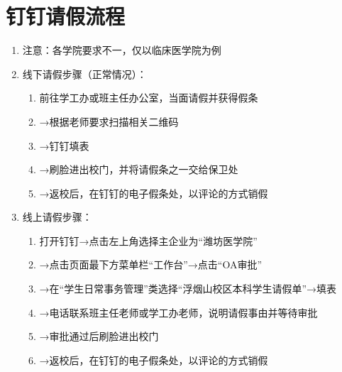 \section[钉钉请假流程]{钉钉请假流程\footnotemark}
\label{leave_dingtalk}
\begin{enumerate}
    \item 注意：各学院要求不一，仅以临床医学院为例
    \item 线下请假步骤（正常情况）：
          \begin{enumerate}[（1）]
              \item 前往学工办或班主任办公室，当面请假并获得假条
              \item →根据老师要求扫描相关二维码
              \item →钉钉填表
              \item →刷脸进出校门，并将请假条之一交给保卫处
              \item →返校后，在钉钉的电子假条处，以评论的方式销假
          \end{enumerate}
    \item 线上请假步骤：
          \begin{enumerate}[（1）]
              \item 打开钉钉→点击左上角选择主企业为“潍坊医学院”
              \item →点击页面最下方菜单栏“工作台”→点击“OA审批”
              \item →在“学生日常事务管理”类选择“浮烟山校区本科学生请假单”→填表
              \item →电话联系班主任老师或学工办老师，说明请假事由并等待审批
              \item →审批通过后刷脸进出校门
              \item →返校后，在钉钉的电子假条处，以评论的方式销假
          \end{enumerate}
\end{enumerate}


